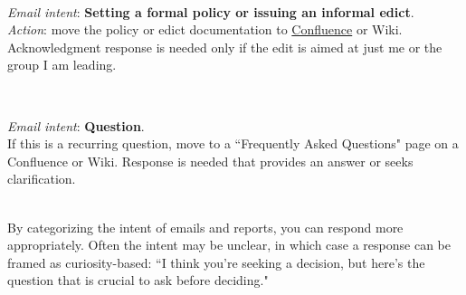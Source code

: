 \ \\
\begin{samepage}
\textit{Email intent}: \textbf{Setting a formal policy or issuing an informal edict}.\\
\textit{Action}: move the policy or edict documentation to \href{https://en.wikipedia.org/wiki/Confluence_(software)}{Confluence}
or Wiki.
\iftoggle{WPinmargin}{\marginpar{$>$Wikipedia: Confluence}}{}%
Acknowledgment response is needed only if the edit is aimed at just me or the group I am leading.
\end{samepage}

\ \\
\begin{samepage}
\textit{Email intent}: \textbf{Question}.\\
If this is a recurring question, move to a ``Frequently Asked Questions" page on a Confluence or Wiki.
Response is needed that provides an answer or seeks clarification.
\end{samepage}

\ \\

By categorizing the intent of emails and reports, you can respond more appropriately. Often the intent may be unclear, in which case a response can be framed as curiosity-based: ``I think you're seeking a decision, but here's the question that is crucial to ask before deciding."

\ \\

